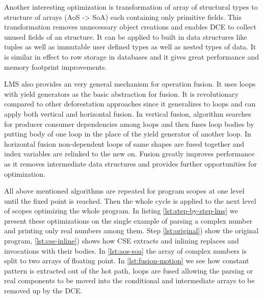 Another interesting optimization is transformation of array of structural types to structure of arrays (AoS -> SoA) each containing only primitive fields. This transformation removes unnecessary object creations and enables DCE to collect unused fields of an structure. It can be applied to built in data structures like tuples as well as immutable user defined types as well as nested types of data. It is similar in effect to row storage in databases and it gives great performance and memory footprint improvements. 

LMS also provides an very general mechanism for operation fusion. It uses loops with yield generators as the basic abstraction for fusion. It is revolutionary compared to other deforestation approaches since it generalizes to loops and can apply both vertical and horizontal fusion. In vertical fusion, algorithm searches for producer consumer dependencies among loops and then fuses loop bodies by putting body of one loop in the place of the yield generator of another loop. In horizontal fusion non-dependent loops of same shapes are fused together and index variables are relinked to the new on. Fusion greatly improves performance as it removes intermediate data structures and provides further opportunities for optimization.  

All above mentioned algorithms are repeated for program scopes at one level until the fixed point is reached. Then the whole cycle is applied to the next level of scopes optimizing the whole program. In listing \ref{lst:step-by-step-lms} we present these optimizations on the single example of parsing a complex number and printing only real numbers among them. Step \ref{lst:original}) show the original program, \ref{lst:cse-inline}) shows how CSE extracts  and inlining replaces  and  invocations with their bodies. In \ref{lst:aos-soa} the array  of complex numbers is split to two arrays of floating point. In \ref{lst:fusion-motion} we see how constant pattern is extracted out of the hot path, loops are fused allowing the parsing or real components to be moved into the conditional and intermediate arrays to be removed up by the DCE. 

